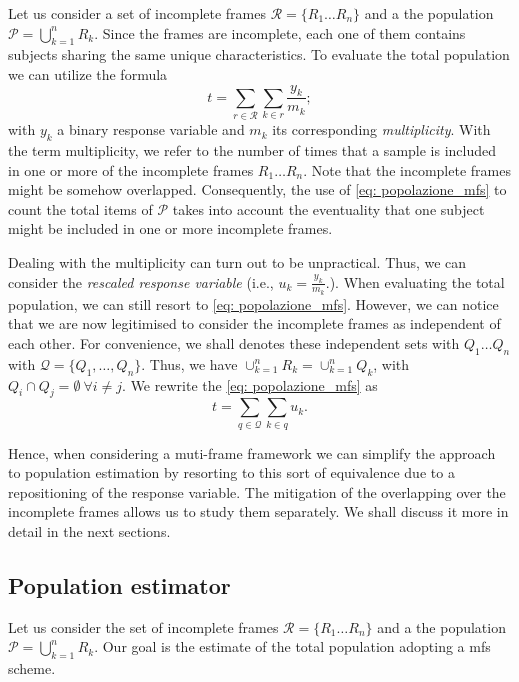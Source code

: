 \begin{appendices}
Let us consider a set of incomplete frames $\mathcal{R} = \{R_{1} \dots R_{n}\}$ and a the population $\mathcal{P} = \bigcup_{k= 1}^{n} R_k.$
Since the frames are incomplete, each one of them contains subjects sharing the same unique characteristics.
To evaluate the total population we can utilize the formula
\begin{equation}\label{eq: popolazione_mfs}
    t = \sum_{r \in \mathcal{R}}\sum_{k \in r} \frac{y_{k}}{m_{k}};
\end{equation}
with $y_{k}$ a binary response variable and $m_{k}$ its corresponding  \emph{multiplicity}.
With the term multiplicity, we refer to the number of times that a sample is included in one or more of the incomplete frames $R_{1} \dots R_{n}$.
Note that the incomplete frames might be somehow overlapped. 
Consequently, the use of \eqref{eq: popolazione_mfs} to count the total items of $\mathcal{P}$ takes into account the eventuality that one subject might be included in one or more incomplete frames.  

Dealing with the multiplicity can turn out to be unpractical.
Thus, we can consider the \emph{rescaled response variable} (i.e., ${u}_{k} = \frac{y_{k}}{m_{k}}.$).
When evaluating the total population, we can still resort to \eqref{eq: popolazione_mfs}.
However, we can notice that we are now legitimised to consider the incomplete frames as independent of each other.
For convenience, we shall denotes these independent sets with $Q_{1} \dots Q_{n}$ with $\mathcal{Q} = \{Q_{1}, \dots, Q_{n}\}$.
Thus,  we have $\cup_{k=1}^{n}{R_k} = \cup_{k=1}^{n}{Q_k}$, with ${Q_i}\cap{Q_j} = \emptyset ~\forall i\neq j$.
We  rewrite the \eqref{eq: popolazione_mfs} as
\begin{equation}\label{eq: popolazione_mfs_srs}
    t = \sum_{q \in \mathcal{Q}} \sum_{k \in q} u_{k}.
\end{equation}

Hence, when considering a muti-frame framework we can simplify the approach to population estimation by resorting to this sort of equivalence due to a repositioning of the response variable.
The mitigation of the overlapping over the incomplete frames allows us to study them separately.
We shall discuss it more in detail in the next sections.

\subsection{Population estimator}
Let us consider the set of incomplete frames $\mathcal{R} = \{R_{1} \dots R_{n}\}$ and a the population $\mathcal{P} = \bigcup_{k= 1}^{n} R_k.$
Our goal is the estimate of the total population adopting a \gls{mfs} scheme.


\end{appendices}
